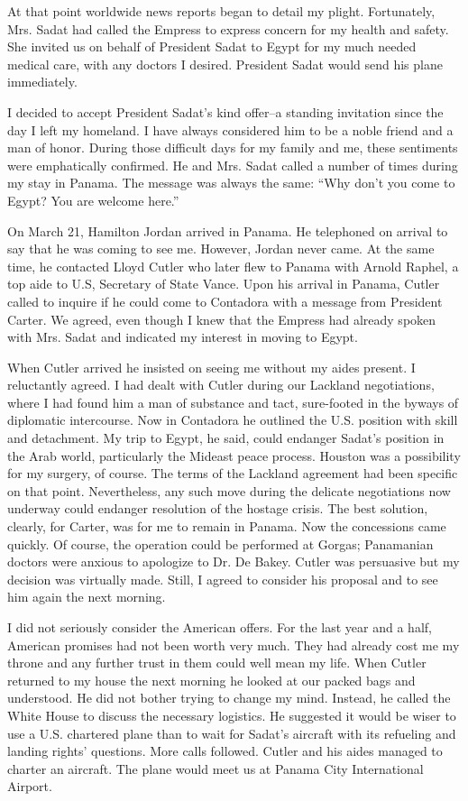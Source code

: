 At that point worldwide news reports began to detail my plight. Fortunately, Mrs. Sadat had called the Empress to express concern for my health and safety. She invited us on behalf of President Sadat to Egypt for my much needed medical care, with any doctors I desired. President Sadat would send his plane immediately. 

I decided to accept President Sadat's kind offer--a standing invitation since the day I left my homeland. I have always considered him to be a noble friend and a man of honor. During those difficult days for my family and me, these sentiments were emphatically confirmed. He and Mrs. Sadat called a number of times during my stay in Panama. The message was always the same: “Why don't you come to Egypt? You are welcome here.” 

On March 21, Hamilton Jordan arrived in Panama. He telephoned on arrival to say that he was coming to see me. However, Jordan never came. At the same time, he contacted Lloyd Cutler who later flew to Panama with Arnold Raphel, a top aide to U.S, Secretary of State Vance. Upon his arrival in Panama, Cutler called to inquire if he could come to Contadora with a message from President Carter. We agreed, even though I knew that the Empress had already spoken with Mrs. Sadat and indicated my interest in moving to Egypt. 

When Cutler arrived he insisted on seeing me without my aides present. I reluctantly agreed. I had dealt with Cutler during our Lackland negotiations, where I had found him a man of substance and tact, sure-footed in the byways of diplomatic intercourse. Now in Contadora he outlined the U.S. position with skill and detachment. My trip to Egypt, he said, could endanger Sadat's position in the Arab world, particularly the Mideast peace process. Houston was a possibility for my surgery, of course. The terms of the Lackland agreement had been specific on that point. Nevertheless, any such move during the delicate negotiations now underway could endanger resolution of the hostage crisis. The best solution, clearly, for Carter, was for me to remain in Panama. Now the concessions came quickly. Of course, the operation could be performed at Gorgas; Panamanian doctors were anxious to apologize to Dr. De Bakey. Cutler was persuasive but my decision was virtually made. Still, I agreed to consider his proposal and to see him again the next morning. 

I did not seriously consider the American offers. For the last year and a half, American promises had not been worth very much. They had already cost me my throne and any further trust in them could well mean my life. When Cutler returned to my house the next morning he looked at our packed bags and understood. He did not bother trying to change my mind. Instead, he called the White House to discuss the necessary logistics. He suggested it would be wiser to use a U.S. chartered plane than to wait for Sadat’s aircraft with its refueling and landing rights’ questions. More calls followed. Cutler and his aides managed to charter an aircraft. The plane would meet us at Panama City International Airport. 

